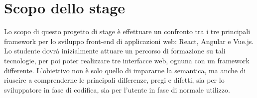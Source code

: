 \section*{Scopo dello stage}
Lo scopo di questo progetto di stage è effettuare un confronto tra i tre principali framework per lo sviluppo front-end di applicazioni web: React, Angular e Vue.js. \\
Lo studente dovrà inizialmente attuare un percorso di formazione su tali tecnologie, per poi poter realizzare tre interfacce web, ognuna con un framework differente. 
L'obiettivo non è solo quello di impararne la semantica, ma anche di riuscire a comprenderne le principali differenze, pregi e difetti, sia per lo sviluppatore in fase di codifica, sia per l'utente in fase di normale utilizzo. 


